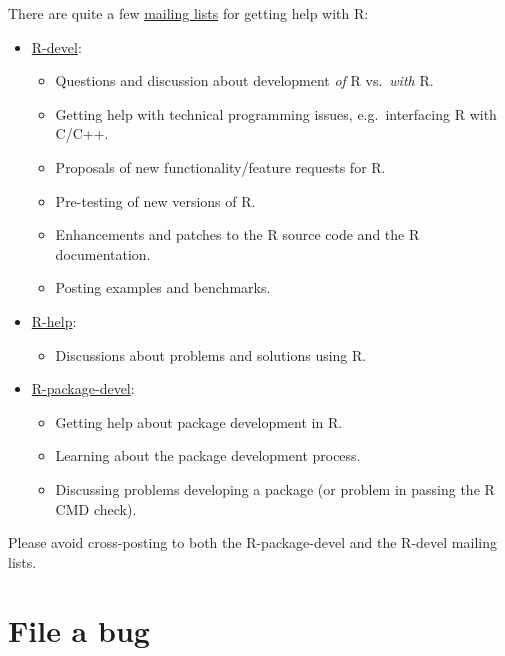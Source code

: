 \documentclass[
  letterpaper,
  DIV=11,
  numbers=noendperiod]{scrreprt}
\providecommand{\tightlist}{%
  \setlength{\itemsep}{0pt}\setlength{\parskip}{0pt}}\usepackage{longtable,booktabs,array}
\begin{document}
There are quite a few \href{https://www.r-project.org/mail.html}{mailing
lists} for getting help with R:

\begin{itemize}
\tightlist
\item
  \href{https://stat.ethz.ch/mailman/listinfo/r-devel}{R-devel}:

  \begin{itemize}
  \tightlist
  \item
    Questions and discussion about development \emph{of} R
    vs.~\emph{with} R.
  \item
    Getting help with technical programming issues, e.g.~interfacing R
    with C/C++.
  \item
    Proposals of new functionality/feature requests for R.
  \item
    Pre-testing of new versions of R.
  \item
    Enhancements and patches to the R source code and the R
    documentation.
  \item
    Posting examples and benchmarks.
  \end{itemize}
\item
  \href{https://stat.ethz.ch/mailman/listinfo/r-help}{R-help}:

  \begin{itemize}
  \tightlist
  \item
    Discussions about problems and solutions using R.
  \end{itemize}
\item
  \href{https://stat.ethz.ch/mailman/listinfo/r-package-devel}{R-package-devel}:

  \begin{itemize}
  \tightlist
  \item
    Getting help about package development in R.
  \item
    Learning about the package development process.
  \item
    Discussing problems developing a package (or problem in passing the
    R CMD check).
  \end{itemize}
\end{itemize}

Please avoid cross-posting to both the R-package-devel and the R-devel
mailing lists.

\section{File a bug}\label{file-a-bug}
\end{document}
